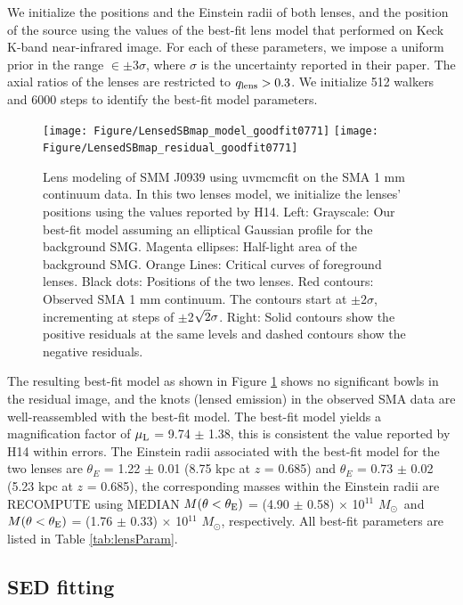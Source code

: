 \documentclass[twocolumn,apj,numberedappendix]{emulateapj}
\newcommand{\Msun}{\mbox{$M_{\odot}$}}
\begin{document}
We initialize the positions and the Einstein radii of both lenses, and the position of the source using the
values of the best-fit lens model that \citet{Haas14} performed on Keck K-band near-infrared image. For each of
these parameters, we impose a uniform prior in the range $\in\pm$3$\sigma$, where $\sigma$ is the uncertainty
reported in their paper. The axial ratios of the lenses are restricted to $q_{\rm lens} > 0.3$. We initialize 512
walkers and 6000 steps to identify the best-fit model parameters.
\begin{figure}[!tbpH]
\centering
\texttt{[image: Figure/LensedSBmap\_model\_goodfit0771]}
\texttt{[image: Figure/LensedSBmap\_residual\_goodfit0771]}
\caption{Lens modeling of SMM J0939 using {\sc uvmcmcfit} on the SMA 1 mm continuum data.
In this two lenses model, we initialize the lenses' positions using the values reported by H14. Left:
Grayscale: Our best-fit model assuming an elliptical Gaussian profile for the background SMG. Magenta ellipses:
Half-light area of the background SMG. Orange Lines: Critical curves of foreground lenses. Black dots: Positions of
the two lenses. Red contours: Observed SMA 1 mm continuum. The contours start at $\pm$2$\sigma$, incrementing at
steps of $\pm$2$\sqrt{\rm 2}\sigma$. Right: Solid contours show the positive residuals at the same levels and dashed contours
show the negative residuals. \label{fig:lens}}
\end{figure}

The resulting best-fit model as shown in Figure \ref{fig:lens} shows no significant bowls in the residual
image, and the knots (lensed emission) in the observed SMA data are well-reassembled with the best-fit model.
The best-fit model yields a magnification
factor of $\mu_{\rm L}$ = 9.74 $\pm$ 1.38, this is consistent the value reported by H14 within errors. The Einstein radii associated with the best-fit model for the two lenses are $\theta_{E}$ =
1.22 $\pm$ 0.01 (8.75 kpc at $z$ = 0.685) and $\theta_{E}$ = 0.73 $\pm$ 0.02 (5.23 kpc at $z$ = 0.685),
the corresponding masses within the Einstein radii are RECOMPUTE using MEDIAN $M(\theta < \theta_{\rm E})$ = (4.90 $\pm$ 0.58) $\times$ 10$^{11}$ 
\Msun\ 
and $M(\theta < \theta_{\rm E})$ = (1.76 $\pm$ 0.33) $\times$ 10$^{11}$ \Msun, respectively. All best-fit
parameters are listed in Table \ref{tab:lensParam}.


\subsection{SED fitting} \label{sec:SED}
\end{document}

